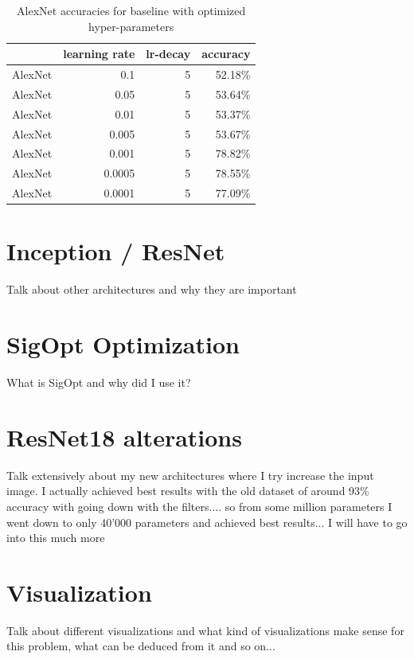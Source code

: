 \begin{table}[t] \centering
{}
\caption{AlexNet accuracies for baseline with optimized hyper-parameters}
\begin{tabular}{@{}rrrr@{}}
\toprule & learning rate & lr-decay & accuracy \\
\midrule
AlexNet		& 0.1 		& 5		& 52.18\%  \\
AlexNet		& 0.05 		& 5		& 53.64\%  \\
AlexNet		& 0.01 		& 5		& 53.37\%  \\
AlexNet		& 0.005 		& 5		& 53.67\%  \\
AlexNet		& 0.001 		& 5		& 78.82\%  \\
AlexNet		& 0.0005 		& 5		& 78.55\%  \\
AlexNet		& 0.0001 		& 5		& 77.09\%  \\
\bottomrule
\end{tabular}
\label{tbl:AlexNetBaseline}
\end{table}


\section{Inception / ResNet}

Talk about other architectures and why they are important

\section{SigOpt Optimization}

What is SigOpt and why did I use it?

\section{ResNet18 alterations}

Talk extensively about my new architectures where I try increase the input image. I actually achieved best results with the old dataset of around 93\% accuracy with going down with the filters.... so from some million parameters I went  down to only 40'000 parameters and achieved best results... I will have to go into this much more

\section{Visualization}

Talk about different visualizations and what kind of visualizations make sense for this problem, what can be deduced from it and so on... 